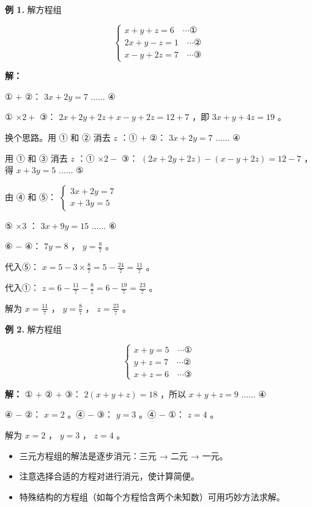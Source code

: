 \begin{workedexamples}


\textbf{例 1.} 解方程组

\[
\begin{cases}
x + y + z = 6 \quad \cdots ① \\
2x + y - z = 1 \quad \cdots ② \\
x - y + 2z = 7 \quad \cdots ③
\end{cases}
\]


\textbf{解：}

① $+$ ②： $3x + 2y = 7$ ...... ④

① $\times 2 +$ ③： $2x + 2y + 2z + x - y + 2z = 12 + 7$ ，即 $3x + y + 4z = 19$ 。

换个思路。用 ① 和 ② 消去 $z$ ：① $+$ ②： $3x + 2y = 7$ ...... ④

用 ① 和 ③ 消去 $z$ ：① $\times 2 -$ ③： $(2x + 2y + 2z) - (x - y + 2z) = 12 - 7$ ，得 $x + 3y = 5$ ...... ⑤

由 ④ 和 ⑤： $\begin{cases} 3x + 2y = 7 \\ x + 3y = 5 \end{cases}$

⑤ $\times 3$ ： $3x + 9y = 15$ ...... ⑥

⑥ $-$ ④： $7y = 8$ ， $y = \frac{8}{7}$ 。

代入⑤： $x = 5 - 3 \times \frac{8}{7} = 5 - \frac{24}{7} = \frac{11}{7}$ 。

代入①： $z = 6 - \frac{11}{7} - \frac{8}{7} = 6 - \frac{19}{7} = \frac{23}{7}$ 。

解为 $x = \frac{11}{7}$ ， $y = \frac{8}{7}$ ， $z = \frac{23}{7}$ 。

\textbf{例 2.} 解方程组

\[
\begin{cases}
x + y = 5 \quad \cdots ① \\
y + z = 7 \quad \cdots ② \\
x + z = 6 \quad \cdots ③
\end{cases}
\]


\textbf{解：} ① $+$ ② $+$ ③： $2(x + y + z) = 18$ ，所以 $x + y + z = 9$ ...... ④

④ $-$ ②： $x = 2$ 。④ $-$ ③： $y = 3$ 。④ $-$ ①： $z = 4$ 。

解为 $x = 2$ ， $y = 3$ ， $z = 4$ 。

\end{workedexamples}

\begin{keytakeaway}


\begin{itemize}
  \item 三元方程组的解法是逐步消元：三元 → 二元 → 一元。
  \item 注意选择合适的方程对进行消元，使计算简便。
  \item 特殊结构的方程组（如每个方程恰含两个未知数）可用巧妙方法求解。
\end{itemize}


\end{keytakeaway}

